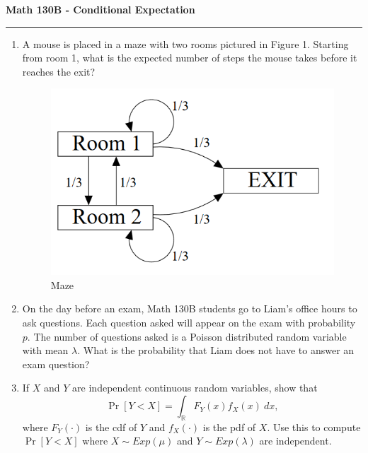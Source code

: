 \documentclass[11pt,letterpaper]{report}
\newcommand{\reals}{\mathbb{R}}
\begin{document}
\begin{center}
{\bf \Large Math 130B - Conditional Expectation}
\vspace{0.2cm}
\hrule
\end{center}
\begin{enumerate}
	\item A mouse is placed in a maze with two rooms pictured in Figure 1. Starting from room 1, what is the expected number of steps the mouse takes before it reaches the exit?
	\begin{figure}[h]
		\centering
			\includegraphics[scale=.6]{diagram.PNG}
			\caption{Maze}
	\end{figure}
	\vfill
	\item On the day before an exam, Math 130B students go to Liam's office hours to ask questions. Each question asked will appear on the exam with probability $p$. The number of questions asked is a Poisson distributed random variable with mean $\lambda$. What is the probability that Liam does not have to answer an exam question?

	\vfill

	\item If $X$ and $Y$ are independent continuous random variables, show that
	\[
	\Pr[Y<X] = \int_\reals F_Y(x)f_X(x)\ dx,
	\]
	where $F_Y(\cdot)$ is the cdf of $Y$ and $f_X(\cdot)$ is the pdf of $X$. Use this to compute $\Pr[Y<X]$ where $X\sim Exp(\mu)$ and $Y\sim Exp(\lambda)$ are independent.
	\vfill
\end{enumerate}
\end{document}
